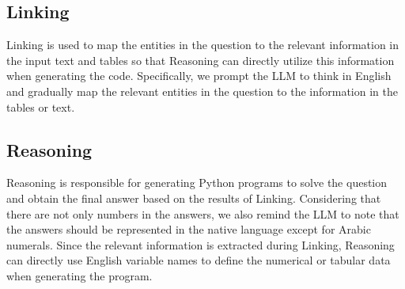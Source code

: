 \subsection{Linking}
Linking is used to map the entities in the question to the relevant information in the input text and tables so that Reasoning can directly utilize this information when generating the code. 
Specifically, we prompt the LLM to think in English and gradually map the relevant entities in the question to the information in the tables or text.

\subsection{Reasoning}
Reasoning is responsible for generating Python programs to solve the question and obtain the final answer based on the results of Linking. 
Considering that there are not only numbers in the answers, we also remind the LLM to note that the answers should be represented in the native language except for Arabic numerals.
Since the relevant information is extracted during Linking, Reasoning can directly use English variable names to define the numerical or tabular data when generating the program.